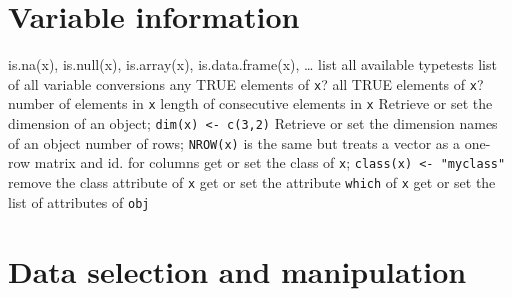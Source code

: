 \section{Variable information}{is.na(x), is.null(x), is.array(x), is.data.frame(x), \ldots}
	{list all available typetests}
	{list of all variable conversions}
	{any TRUE elements of {\tt x}?}
	{all TRUE elements of {\tt x}?}
	{ number of elements in {\tt x}}
	{length of consecutive elements in {\tt x}}
	{Retrieve or set the dimension of an object; {\tt dim(x) <- c(3,2)}}
	{Retrieve or set the dimension names of an object}
	{number of rows; {\tt NROW(x)} is the same but treats a vector as a one-row matrix}
	{and}
	{id. for columns}
	{get or set the class of {\tt x}; {\tt class(x) <- "myclass"}}
	{remove the class attribute of {\tt x}}
	{get or set the attribute {\tt which} of {\tt x}}
	{get or set the list of attributes of {\tt obj}}

\section{Data selection and manipulation}{}

